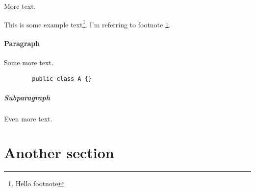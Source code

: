 \documentclass[11pt]{scrartcl}
\begin{document}
	More text.
	
	This is some example text\footnote{\label{myfootnote}Hello footnote}.
	I'm referring to footnote \ref{myfootnote}.
	
	\paragraph{Paragraph}
	
	Some more text.
	
	\begin{lstlisting}
		public class A {}
	\end{lstlisting}
	
	\subparagraph{Subparagraph}
	
	Even more text.
	
	\section{Another section}
	
	\newpage
	
	\begin{appendix}
		\listoffigures
	\end{appendix}
	
	\printbibliography
	
\end{document}
